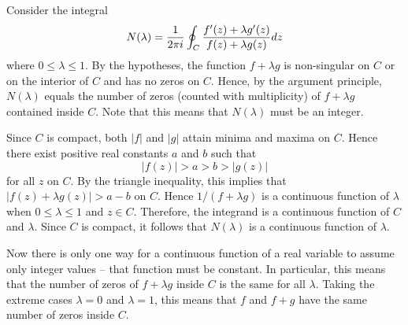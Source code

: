 \documentclass[12pt]{article}
\begin{document}
Consider the integral
 $$N(\lambda) = {1 \over 2 \pi i} \oint_C {f'(z) + \lambda g'(z) \over f(z) + \lambda g(z)} dz$$
where $0 \le \lambda \le 1$.  By the hypotheses, the function $f + \lambda g$ is non-singular on $C$ or on the interior of $C$ and has no zeros on $C$.  Hence, by the argument principle, $N(\lambda)$ equals the number of zeros (counted with multiplicity) of $f + \lambda g$ contained inside $C$.  Note that this means that $N(\lambda)$ must be an integer.

Since $C$ is compact, both $|f|$ and $|g|$ attain minima and maxima on $C$.  Hence there exist positive real constants $a$ and $b$ such that
 $$|f(z)| > a > b > |g(z)|$$
for all $z$ on $C$.  By the triangle inequality, this implies that $|f(z) + \lambda g(z)| > a - b$ on $C$.  Hence $1/(f + \lambda g)$ is a continuous function of $\lambda$ when $0 \le \lambda \le 1$ and $z \in C$.  Therefore, the integrand is a continuous function of $C$ and $\lambda$.  Since $C$ is compact, it follows that $N(\lambda)$ is a continuous function of $\lambda$.

Now there is only one way for a continuous function of a real variable to assume only integer values -- that function must be constant.  In particular, this means that the number of zeros of $f + \lambda g$ inside $C$ is the same for all $\lambda$.  Taking the extreme cases $\lambda = 0$ and $\lambda = 1$, this means that $f$ and $f+g$ have the same number of zeros inside $C$.
\end{document}

